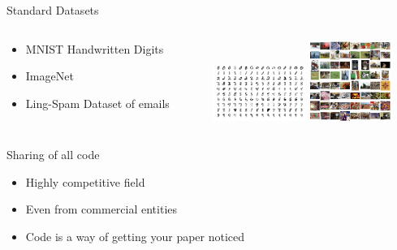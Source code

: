 \documentclass[aspectratio=169, 14pt]{beamer}
\begin{document}
\begin{frame}{Standard Datasets}

  \begin{columns}
    \begin{column}{0.5\textwidth}
      \begin{itemize}
        \item MNIST Handwritten Digits
        \item ImageNet
        \item Ling-Spam Dataset of emails
      \end{itemize}
    \end{column}
    \begin{column}{0.5\textwidth}
      \center
      \includegraphics[height=5em]{mnist_examples}
      \includegraphics[height=7em]{imagenet_examples}
    \end{column}
  \end{columns}

\end{frame}


\begin{frame}{Sharing of all code}

  \begin{itemize}
    \item Highly competitive field
    \item Even from commercial entities
    \item Code is a way of getting your paper noticed
  \end{itemize}

\end{frame}
\end{document}
